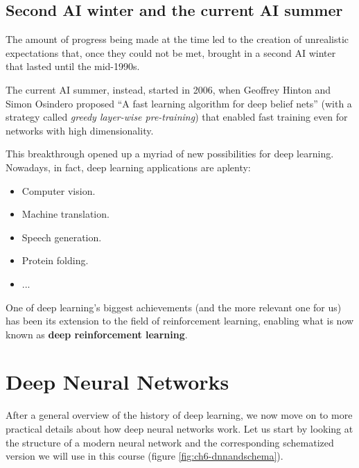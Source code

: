 \subsection{Second AI winter and the current AI summer}
The amount of progress being made at the time led to the creation of unrealistic expectations that, once they could not be met, brought in a second AI winter that lasted until the mid-1990s.

The current AI summer, instead, started in 2006, when Geoffrey Hinton and Simon Osindero proposed ``A fast learning algorithm for deep belief nets''  \cite{10.1162/neco.2006.18.7.1527} (with a strategy called \textit{greedy layer-wise pre-training}) that enabled fast training even for networks with high dimensionality.

This breakthrough opened up a myriad of new possibilities for deep learning. Nowadays, in fact, deep learning applications are aplenty: 

\begin{itemize}
    \item Computer vision.
    \item Machine translation.
    \item Speech generation.
    \item Protein folding.
    \item ...
\end{itemize}

One of deep learning's biggest achievements (and the more relevant one for us) has been its extension to the field of reinforcement learning, enabling what is now known as \textbf{deep reinforcement learning}.

\section{Deep Neural Networks}
After a general overview of the history of deep learning, we now move on to more practical details about how deep neural networks work. Let us start by looking at the structure of a modern neural network and the corresponding schematized version we will use in this course (figure \ref{fig:ch6-dnnandschema}).

